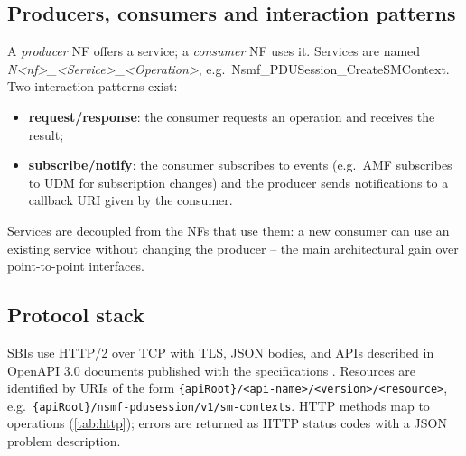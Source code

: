 \documentclass[11pt,a4paper]{article}
\begin{document}
\begin{acnfigure}
  \caption{5G system with service-based control plane (SBI) and reference points to the RAN and UPF.}
  \label{fig:sba}
\end{acnfigure}

\subsection{Producers, consumers and interaction patterns}
A \emph{producer} NF offers a service; a \emph{consumer} NF uses it. Services are named
\emph{N\textless nf\textgreater\_\allowbreak\textless Service\textgreater\_\allowbreak\textless Operation\textgreater}, e.g.\ Nsmf\_\allowbreak PDUSession\_\allowbreak CreateSMContext.
Two interaction patterns exist:
\begin{itemize}
  \item \textbf{request/response}: the consumer requests an operation and receives the result;
  \item \textbf{subscribe/notify}: the consumer subscribes to events (e.g.\ AMF subscribes to UDM for subscription changes)
        and the producer sends notifications to a callback URI given by the consumer.
\end{itemize}
Services are decoupled from the NFs that use them: a new consumer can use an existing service without changing the producer
-- the main architectural gain over point-to-point interfaces.

\subsection{Protocol stack}
SBIs use HTTP/2 \cite{rfc9113} over TCP with TLS, JSON bodies, and APIs described in OpenAPI 3.0 documents published with the
specifications \cite{ts29500,ts29501}. Resources are identified by URIs of the form
\nolinkurl{{apiRoot}/<api-name>/<version>/<resource>}, e.g.\
\nolinkurl{{apiRoot}/nsmf-pdusession/v1/sm-contexts}. HTTP methods map to operations (\cref{tab:http}); errors are returned
as HTTP status codes with a JSON problem description.
\end{document}
